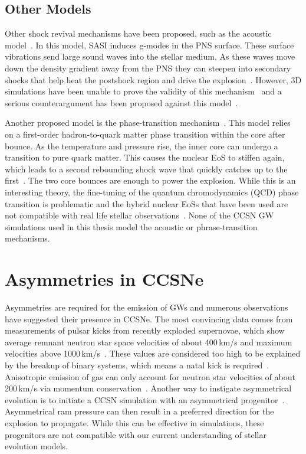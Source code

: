 \subsection{Other Models}

Other shock revival mechanisms have been proposed, such as the acoustic model~\cite{burrows2007features}. In this model, SASI induces g-modes in the PNS surface. These surface vibrations send large sound waves into the stellar medium. As these waves move down the density gradient away from the PNS they can steepen into secondary shocks that help heat the postshock region and drive the explosion~\cite{janka}. However, 3D simulations have been unable to prove the validity of this mechanism~\cite{marek2009delayed} and a serious counterargument has been proposed against this model~\cite{weinberg2008non}.

Another proposed model is the phase-transition mechanism~\cite{sagert2009signals, fischer2011core}. This model relies on a first-order hadron-to-quark matter phase transition within the core after bounce. As the temperature and pressure rise, the inner core can undergo a transition to pure quark matter. This causes the nuclear EoS to stiffen again, which leads to a second rebounding shock wave that quickly catches up to the first~\cite{sagert2009signals, fischer2011core}. The two core bounces are enough to power the explosion. While this is an interesting theory, the fine-tuning of the quantum chromodynamics (QCD) phase transition is problematic and the hybrid nuclear EoSs that have been used are not compatible with real life stellar observations~\cite{janka}. None of the CCSN GW simulations used in this thesis model the acoustic or phrase-transition mechanisms.

\section{Asymmetries in CCSNe}

Asymmetries are required for the emission of GWs and numerous observations have suggested their presence in CCSNe. The most convincing data comes from measurements of pulsar kicks from recently exploded supernovae, which show average remnant neutron star space velocities of about 400\,km/s and maximum velocities above 1000\,km/s~\cite{hobbs2005statistical}. These values are considered too high to be explained by the breakup of binary systems, which means a natal kick is required~\cite{lai2001pulsar}. Anisotropic emission of gas can only account for neutron star velocities of about 200\,km/s via momentum conservation~\cite{janka1994neutron}. Another way to instigate asymmetrical evolution is to initiate a CCSN simulation with an asymmetrical progenitor~\cite{burrows1996pulsar, arnett2011toward}. Asymmetrical ram pressure can then result in a preferred direction for the explosion to propagate. While this can be effective in simulations, these progenitors are not compatible with our current understanding of stellar evolution models.

